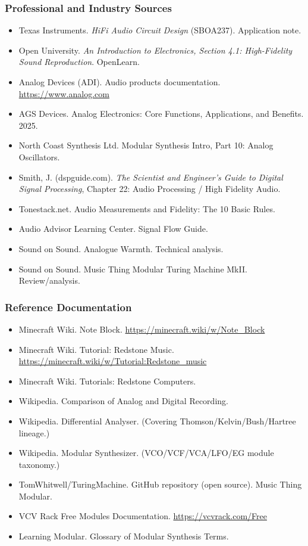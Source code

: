 \documentclass[11pt,letterpaper]{article}
\begin{document}
\subsubsection{Professional and Industry Sources}

\begin{itemize}[leftmargin=2em]
  \item Texas Instruments. \textit{HiFi Audio Circuit Design} (SBOA237). Application note.
  \item Open University. \textit{An Introduction to Electronics, Section 4.1: High-Fidelity Sound Reproduction}. OpenLearn.
  \item Analog Devices (ADI). Audio products documentation. \url{https://www.analog.com}
  \item AGS Devices. Analog Electronics: Core Functions, Applications, and Benefits. 2025.
  \item North Coast Synthesis Ltd. Modular Synthesis Intro, Part 10: Analog Oscillators.
  \item Smith, J. (dspguide.com). \textit{The Scientist and Engineer's Guide to Digital Signal Processing}, Chapter 22: Audio Processing / High Fidelity Audio.
  \item Tonestack.net. Audio Measurements and Fidelity: The 10 Basic Rules.
  \item Audio Advisor Learning Center. Signal Flow Guide.
  \item Sound on Sound. Analogue Warmth. Technical analysis.
  \item Sound on Sound. Music Thing Modular Turing Machine MkII. Review/analysis.
\end{itemize}

\subsubsection{Reference Documentation}

\begin{itemize}[leftmargin=2em]
  \item Minecraft Wiki. Note Block. \url{https://minecraft.wiki/w/Note_Block}
  \item Minecraft Wiki. Tutorial: Redstone Music. \url{https://minecraft.wiki/w/Tutorial:Redstone_music}
  \item Minecraft Wiki. Tutorials: Redstone Computers.
  \item Wikipedia. Comparison of Analog and Digital Recording.
  \item Wikipedia. Differential Analyser. (Covering Thomson/Kelvin/Bush/Hartree lineage.)
  \item Wikipedia. Modular Synthesizer. (VCO/VCF/VCA/LFO/EG module taxonomy.)
  \item TomWhitwell/TuringMachine. GitHub repository (open source). Music Thing Modular.
  \item VCV Rack Free Modules Documentation. \url{https://vcvrack.com/Free}
  \item Learning Modular. Glossary of Modular Synthesis Terms.
\end{itemize}
\end{document}
